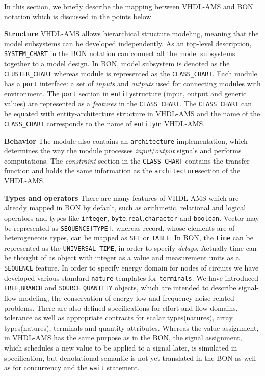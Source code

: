 \documentclass{article}
\def\lstinlinen{\lstinline[language=Bon,basicstyle=\normalsize\upshape]}
\newcommand{\ent}{entity\xspace}
\newcommand{\arch}{architecture\xspace}
\begin{document}
In this section, we briefly describe the mapping between VHDL-AMS and
BON notation which is discussed in the points below.

\textbf{Structure} \xspace \xspace VHDL-AMS allows hierarchical
structure modeling, meaning that the model subsystems can be developed
independently.  As an top-level description, \lstinlinen|SYSTEM_CHART|
in the BON notation can connect all the model subsystems together to a
model design.  In BON, model subsystem is denoted as the
\lstinlinen|CLUSTER_CHART| whereas module is represented as the
\lstinlinen|CLASS_CHART|.  Each module has a \texttt{port} interface:
a set of \emph{inputs} and \emph{outputs} used for connecting modules
with environment. The \texttt{port} section in \texttt{\ent}structure
(input, output and generic values) are represented as a
\emph{features} in the \lstinlinen|CLASS_CHART|.  The
\lstinlinen|CLASS_CHART| \xspace can be equated with \ent-\arch
structure in VHDL-AMS and the name of the
\lstinlinen|CLASS_CHART|\xspace corresponds to the name of
\texttt{\ent}in VHDL-AMS.
 
\textbf{Behavior} \xspace \xspace The module also contains an
\texttt{\arch} implementation, which determines the way the module
processes \emph{input}/\emph{output} signals and performs
computations.  The \emph{constraint} section in the
\lstinlinen|CLASS_CHART| contains the transfer function and holds the
same information as the \texttt{\arch}section of the VHDL-AMS.
 
\textbf{Types and operators} \xspace \xspace There are many features
of VHDL-AMS which are already mapped in BON by default, such as
arithmetic, relational and logical operators and types like \xspace
\texttt{integer}, \xspace
\texttt{byte},\xspace\texttt{real},\xspace\texttt{character} and
\xspace\texttt{boolean}.  Vector may be represented as
\lstinlinen|SEQUENCE[TYPE]|, whereas record, whose elements are of
heterogeneous types, can be mapped as \lstinlinen|SET| or
\lstinlinen|TABLE|.  In BON, the \texttt{time} can be represented as
the \lstinlinen|UNIVERSAL_TIME|, in order to specify
\emph{delays}. Actually time can be thought of as object with integer
as a value and measurement units as a \xspace \lstinlinen|SEQUENCE|
feature.  In order to specify energy domain for nodes of circuits we
have developed various standard \texttt{nature} templates for
\texttt{terminals}.  We have introduced
\xspace\lstinlinen|FREE|,\xspace \lstinlinen|BRANCH| and
\xspace\lstinlinen|SOURCE| \space \lstinlinen|QUANTITY| objects, which
are intended to describe signal-flow modeling, the conservation of
energy low and frequency-noise related problems.  There are also
defined specifications for effort and flow domains, tolerance as well
as appropriate contracts for scalar types(natures), array
types(natures), terminals and quantity attributes.  Whereas the value
assignment, in VHDL-AMS has the same purpose as in the BON, the signal
assignment, which schedules a new value to be applied to a signal
later, is simulated in specification, but denotational semantic is not
yet translated in the BON as well as for concurrency and the
\texttt{wait} statement.
\end{document}
